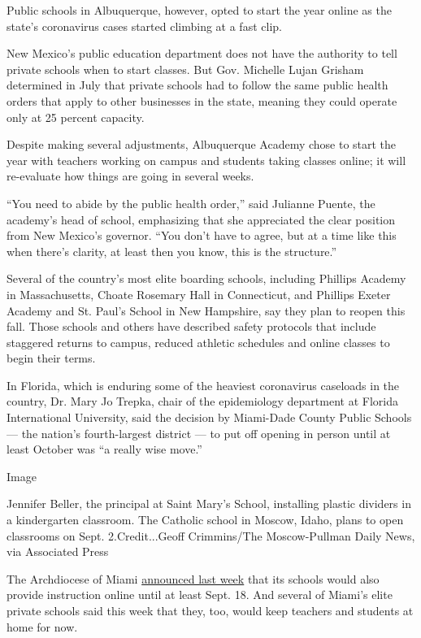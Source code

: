 Public schools in Albuquerque, however, opted to start the year online
as the state's coronavirus cases started climbing at a fast clip.

New Mexico's public education department does not have the authority to
tell private schools when to start classes. But Gov. Michelle Lujan
Grisham determined in July that private schools had to follow the same
public health orders that apply to other businesses in the state,
meaning they could operate only at 25 percent capacity.

Despite making several adjustments, Albuquerque Academy chose to start
the year with teachers working on campus and students taking classes
online; it will re-evaluate how things are going in several weeks.

``You need to abide by the public health order,'' said Julianne Puente,
the academy's head of school, emphasizing that she appreciated the clear
position from New Mexico's governor. ``You don't have to agree, but at a
time like this when there's clarity, at least then you know, this is the
structure.''

Several of the country's most elite boarding schools, including Phillips
Academy in Massachusetts, Choate Rosemary Hall in Connecticut, and
Phillips Exeter Academy and St. Paul's School in New Hampshire, say they
plan to reopen this fall. Those schools and others have described safety
protocols that include staggered returns to campus, reduced athletic
schedules and online classes to begin their terms.

In Florida, which is enduring some of the heaviest coronavirus caseloads
in the country, Dr. Mary Jo Trepka, chair of the epidemiology department
at Florida International University, said the decision by Miami-Dade
County Public Schools --- the nation's fourth-largest district --- to
put off opening in person until at least October was ``a really wise
move.''

Image

Jennifer Beller, the principal at Saint Mary's School, installing
plastic dividers in a kindergarten classroom. The Catholic school in
Moscow, Idaho, plans to open classrooms on Sept. 2.Credit...Geoff
Crimmins/The Moscow-Pullman Daily News, via Associated Press

The Archdiocese of Miami
\href{https://www.miamiarch.org/CatholicDiocese.php?op=Article_miami-archdiocesan-schools-to-start-aug-19-with-virtual-learning}{announced
last week} that its schools would also provide instruction online until
at least Sept. 18. And several of Miami's elite private schools said
this week that they, too, would keep teachers and students at home for
now.


